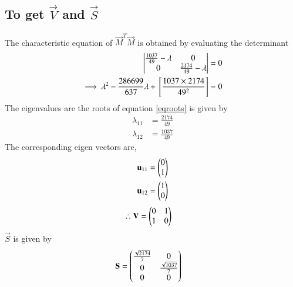 \documentclass[journal,12pt,twocolumn]{IEEEtran}
\begin{document}
\subsection{To get $\vec{V}$ and $\vec{S}$ }
The characteristic equation of $\vec{M}^T\vec{M}$ is obtained by evaluating the determinant 
\begin{align}
    \begin{vmatrix} \frac{1037}{49} - \lambda & 0\\ 0 & \frac{2174}{49} - \lambda\end{vmatrix} &= 0\\
	\implies \lambda^2 - \frac{286699}{637}\lambda + {}\left[\frac{1037 \times 2174}{49^2}\right] &=0\label{eqroots}
\end{align}
The eigenvalues are the roots of equation \ref{eqroots} is given by 
\begin{align}
	\lambda_{11}&= \frac{2174}{49} \label{eqeig1}\\
	\lambda_{12}&=\frac{1037}{49} \label{eqeig2}
\end{align}
The corresponding eigen vectors are, 
\begin{align}
	\mathbf{u}_{11} &=\begin{pmatrix}0 \\ 1\end{pmatrix}\\
	\mathbf{u}_{12} &=\begin{pmatrix}1 \\ 0\end{pmatrix}
\end{align}
\begin{align}
\therefore	\mathbf{V} &=\begin{pmatrix}0 & 1\\1 & 0\end{pmatrix}
\end{align}
$\vec{S}$ is given by 
\begin{align}
	\mathbf{S}&=\begin{pmatrix}\frac{\sqrt{2174}}{7} & 0\\ 0 & \frac{\sqrt{1037}}{7} \\ 0 &0\end{pmatrix}
\end{align}
\end{document}
